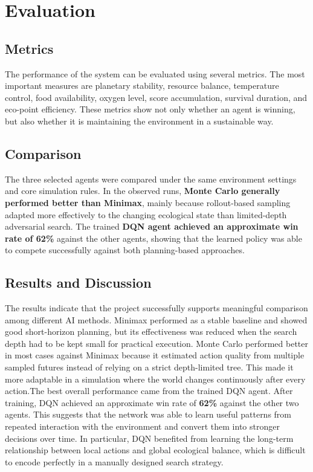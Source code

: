 \documentclass[12pt,a4paper]{article}
\begin{document}
\section{Evaluation}

\subsection{Metrics}

The performance of the system can be evaluated using several metrics. The most important measures are planetary stability, resource balance, temperature control, food availability, oxygen level, score accumulation, survival duration, and eco-point efficiency. These metrics show not only whether an agent is winning, but also whether it is maintaining the environment in a sustainable way.

\subsection{Comparison}

The three selected agents were compared under the same environment settings and core simulation rules. In the observed runs, \textbf{Monte Carlo generally performed better than Minimax}, mainly because rollout-based sampling adapted more effectively to the changing ecological state than limited-depth adversarial search. The trained \textbf{DQN agent achieved an approximate win rate of 62\%} against the other agents, showing that the learned policy was able to compete successfully against both planning-based approaches.

\subsection{Results and Discussion}

The results indicate that the project successfully supports meaningful comparison among different AI methods. Minimax performed as a stable baseline and showed good short-horizon planning, but its effectiveness was reduced when the search depth had to be kept small for practical execution. Monte Carlo performed better in most cases against Minimax because it estimated action quality from multiple sampled futures instead of relying on a strict depth-limited tree. This made it more adaptable in a simulation where the world changes continuously after every action.The best overall performance came from the trained DQN agent. After training, DQN achieved an approximate win rate of \textbf{62\%} against the other two agents. This suggests that the network was able to learn useful patterns from repeated interaction with the environment and convert them into stronger decisions over time. In particular, DQN benefited from learning the long-term relationship between local actions and global ecological balance, which is difficult to encode perfectly in a manually designed search strategy.
\end{document}
